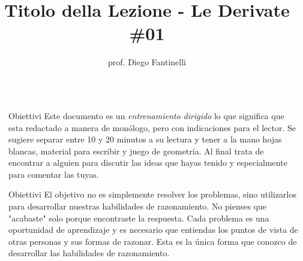 \documentclass[final]{beamer}
\title{Titolo della Lezione - Le Derivate \#01} %
\author{prof. Diego Fantinelli} %
\institute{Liceo Scientifico "Jacopo Da Ponte" - Bassano del Grappa\\ {\em Dipartimento di Matematica}} %
\newlength{\sepwid}
\newlength{\onecolwid}
\begin{document}

\setlength{\belowcaptionskip}{2ex} %
\setlength\belowdisplayshortskip{2ex} %

\begin{frame}[t] %

\begin{columns}[t] %

\begin{column}{\sepwid}\end{column} %

\begin{column}{\onecolwid} %


\begin{block}{Obiettivi}
Este documento es un \emph{entrenamiento dirigido} lo que significa que esta redactado a manera de monólogo, pero con indicaciones para el lector. 
Se sugiere separar entre 10 y 20 minutos a su lectura y tener a la mano hojas blancas, material para escribir y juego de geometría.
Al final trata de encontrar a alguien para discutir las ideas que hayas tenido y especialmente para comentar las tuyas.
\end{block}

\begin{block}{Obiettivi}
El objetivo no es simplemente resolver los problemas, sino utilizarlos para desarrollar nuestras habilidades de razonamiento.
No pienses que "acabaste" solo porque encontraste la respuesta. Cada problema es una oportunidad de aprendizaje y es necesario que entiendas los puntos de vista de otras personas y sus formas de razonar. Esta es la única forma que conozco de desarrollar las habilidades de razonamiento.
\end{block}



\end{column}
\end{columns}
\end{frame}
\end{document}
